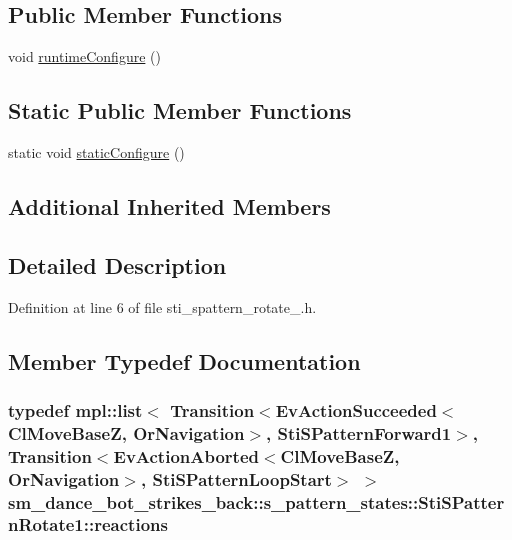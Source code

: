 \subsection*{Public Member Functions}
\begin{DoxyCompactItemize}
\item 
void \hyperlink{structsm__dance__bot__strikes__back_1_1s__pattern__states_1_1StiSPatternRotate1_a2cef1443ce5e8920befcb1421dfca8ee}{runtime\+Configure} ()
\end{DoxyCompactItemize}
\subsection*{Static Public Member Functions}
\begin{DoxyCompactItemize}
\item 
static void \hyperlink{structsm__dance__bot__strikes__back_1_1s__pattern__states_1_1StiSPatternRotate1_a7f0782cfebbbbfff0ab717146c904e49}{static\+Configure} ()
\end{DoxyCompactItemize}
\subsection*{Additional Inherited Members}


\subsection{Detailed Description}


Definition at line 6 of file sti\+\_\+spattern\+\_\+rotate\+\_.\+h.



\subsection{Member Typedef Documentation}
\subsubsection[{\texorpdfstring{reactions}{reactions}}]{\setlength{\rightskip}{0pt plus 5cm}typedef mpl\+::list$<$ Transition$<$Ev\+Action\+Succeeded$<${\bf Cl\+Move\+BaseZ}, {\bf Or\+Navigation}$>$, {\bf Sti\+S\+Pattern\+Forward1}$>$, Transition$<$Ev\+Action\+Aborted$<${\bf Cl\+Move\+BaseZ}, {\bf Or\+Navigation}$>$, {\bf Sti\+S\+Pattern\+Loop\+Start}$>$ $>$ {\bf sm\+\_\+dance\+\_\+bot\+\_\+strikes\+\_\+back\+::s\+\_\+pattern\+\_\+states\+::\+Sti\+S\+Pattern\+Rotate1\+::reactions}}\hypertarget{structsm__dance__bot__strikes__back_1_1s__pattern__states_1_1StiSPatternRotate1_a86dfb53e8686c92849d48dd8679bd32a}{}\label{structsm__dance__bot__strikes__back_1_1s__pattern__states_1_1StiSPatternRotate1_a86dfb53e8686c92849d48dd8679bd32a}


